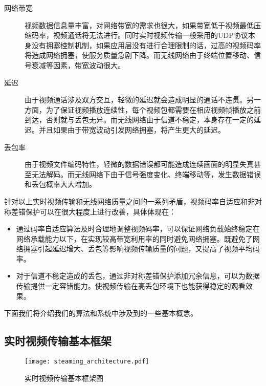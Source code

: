 \begin{description}
    \item[网络带宽] 视频数据信息量丰富，对网络带宽的需求也很大，如果带宽低于视频最低压缩码率，视频通话将无法进行。同时实时视频传输一般采用的UDP协议本身没有拥塞控制机制，如果应用层没有进行合理限制的话，过高的视频码率将造成网络拥塞，使服务质量急剧下降。而无线网络由于终端位置移动、信号衰减等因素，带宽波动很大。
    \item[延迟] 由于视频通话涉及双方交互，轻微的延迟就会造成明显的通话不连贯。另一方面，为了保证视频播放连续性，每个视频包都需要在相应视频帧播放之前到达，否则就与丢包无异。而无线网络由于信道不稳定，本身存在一定的延迟。并且如果由于带宽波动引发网络拥塞，将产生更大的延迟。
    \item[丢包率] 由于视频文件编码特性，轻微的数据错误都可能造成连续画面的明显失真甚至无法解码。而无线网络下由于信号强度变化、终端移动等，发生数据错误和丢包概率大大增加。
\end{description}

针对以上实时视频传输和无线网络质量之间的一系列矛盾，视频码率自适应和非对称差错保护可以在很大程度上进行改善，具体体现在：

\begin{itemize}
    \item 通过码率自适应算法及时合理地调整视频码率，可以保证网络负载始终稳定在网络承载能力以下，在实现较高带宽利用率的同时避免网络拥塞。既避免了网络拥塞引起延迟增大、丢包等影响视频传输质量的问题，又提高了视频平均码率。
    \item 对于信道不稳定造成的丢包，通过非对称差错保护添加冗余信息，可以为数据传输提供一定容错能力。使视频传输在高丢包环境下也能获得稳定的观看效果。
\end{itemize}

下面我们将介绍我们的算法和系统中涉及到的一些基本概念。

\subsection{实时视频传输基本框架}

\begin{figure}[htbp]
  \centering
  \texttt{[image: steaming\_architecture.pdf]}
  \caption{实时视频传输基本框架图}
  \label{fig:steaming_architecture}
\end{figure}

